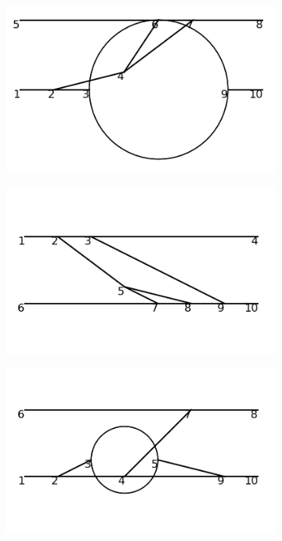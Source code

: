 \documentclass[11pt,a4paper,twoside,pdf]{article}
\numberwithin{equation}{section}
\begin{document}
\begin{figure}[h!]
\begin{subfigure}[t]{0.16\textwidth}
    \end{subfigure}
    \hfill
    \begin{subfigure}[t]{0.16\textwidth}
        \centering
        \includegraphics[width=\textwidth]{plots/order6_2to2/21.png}
    \end{subfigure}
    \hfill
    \begin{subfigure}[t]{0.16\textwidth}
        \centering
        \includegraphics[width=\textwidth]{plots/order6_2to2/22.png}
    \end{subfigure}
    \hfill
    \begin{subfigure}[t]{0.16\textwidth}
        \centering
        \includegraphics[width=\textwidth]{plots/order6_2to2/23.png}

\end{subfigure}
\end{figure}
\end{document}
